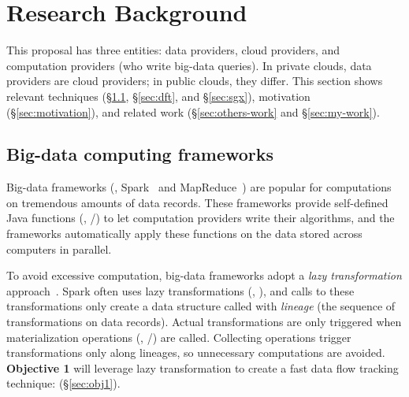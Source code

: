 \vspace{-.15in}\section{Research Background} 
\label{sec:background}\vspace{-.075in}

This proposal has three entities: data providers, cloud 
providers, and computation providers (who write big-data queries). In 
private clouds, data providers are cloud providers; in public clouds, 
they differ. This section shows relevant techniques (\S\ref{sec:bigdata}, 
\S\ref{sec:dft}, and \S\ref{sec:sgx}), motivation (\S\ref{sec:motivation}), and 
related work (\S\ref{sec:others-work} and \S\ref{sec:my-work}).


\vspace{-.15in}\subsection{Big-data computing frameworks} 
\label{sec:bigdata}\vspace{-.075in}

Big-data frameworks (\eg, Spark~\cite{nsdi12:spark} and 
MapReduce~\cite{hadoop}) are popular for computations on tremendous amounts 
of data records. These frameworks provide self-defined Java functions (\eg, 
/) to let computation providers write their algorithms, 
and the frameworks automatically apply these functions on the data stored 
across computers in parallel.



To avoid excessive computation, big-data frameworks adopt a \emph{lazy 
transformation} approach~\cite{pig:vldb08,nsdi12:spark}. Spark 
often uses lazy transformations (\eg, ), and calls to 
these transformations only create a data structure called  with 
\emph{lineage} (the sequence of transformations on data records).
Actual transformations are only triggered when materialization 
operations (\eg, /) are called. Collecting 
operations trigger transformations only along lineages, so unnecessary 
computations are avoided. \textbf{Objective 1} will leverage lazy 
transformation to create a fast data flow tracking technique: \lazyp 
(\S\ref{sec:obj1}).


